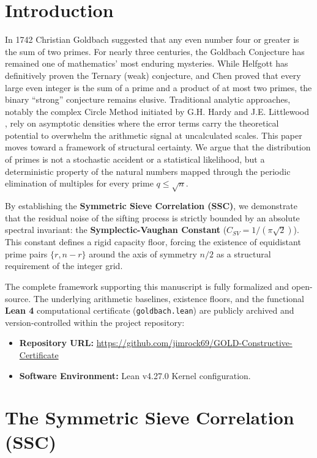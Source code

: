 \documentclass[twoside,9pt]{extarticle}
\begin{document}
\section{Introduction}
In 1742 Christian Goldbach suggested that any even number four or greater is the sum of two primes. For nearly three centuries, the Goldbach Conjecture has remained one of mathematics’ most enduring mysteries. While Helfgott \cite{helfgott2013} has definitively proven the Ternary (weak) conjecture, and Chen \cite{chen1973} proved that every large even integer is the sum of a prime and a product of at most two primes, the binary ``strong'' conjecture remains elusive. 
Traditional analytic approaches, notably the complex Circle Method initiated by G.H. Hardy and J.E. Littlewood \cite{hardy1923}, rely on asymptotic densities where the error terms carry the theoretical potential to overwhelm the arithmetic signal at uncalculated scales. This paper moves toward a framework of structural certainty. We argue that the distribution of primes is not a stochastic accident or a statistical likelihood, but a deterministic property of the natural numbers mapped through the periodic elimination of multiples for every prime $q \le \sqrt{n}$. 

By establishing the \textbf{Symmetric Sieve Correlation (SSC)}, we demonstrate that the residual noise of the sifting process is strictly bounded by an absolute spectral invariant: the \textbf{Symplectic-Vaughan Constant} ($C_{SV} = 1/(\pi\sqrt{2})$). This constant defines a rigid capacity floor, forcing the existence of equidistant prime pairs $\{r, n-r\}$ around the axis of symmetry $n/2$ as a structural requirement of the integer grid.

The complete framework supporting this manuscript is fully formalized and open-source. The underlying arithmetic baselines, existence floors, and the functional \textbf{Lean 4} computational certificate (\texttt{goldbach.lean}) are publicly archived and version-controlled within the project repository:
\begin{itemize}
    \item \textbf{Repository URL:} \label{gitGold}\url{https://github.com/jimrock69/GOLD-Constructive-Certificate}
    \item \textbf{Software Environment:} Lean v4.27.0 Kernel configuration.
\end{itemize}
\section{The Symmetric Sieve Correlation (SSC)} 
\label{sec:ssc}
\end{document}
